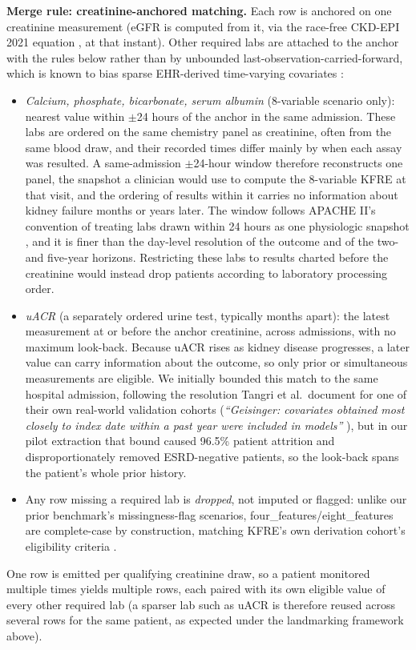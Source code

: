 \documentclass[10pt,letterpaper]{article}
\begin{document}
\textbf{Merge rule: creatinine-anchored matching.} Each row is anchored on one creatinine measurement (eGFR is computed from it, via the race-free CKD-EPI 2021 equation \cite{inker2021ckdepi}, at that instant). Other required labs are attached to the anchor with the rules below rather than by unbounded last-observation-carried-forward, which is known to bias sparse EHR-derived time-varying covariates \cite{hu2022locf_bias}:
\begin{itemize}
    \item \textit{Calcium, phosphate, bicarbonate, serum albumin} (8-variable scenario only): nearest value within $\pm$24 hours of the anchor in the same admission. These labs are ordered on the same chemistry panel as creatinine, often from the same blood draw, and their recorded times differ mainly by when each assay was resulted. A same-admission $\pm$24-hour window therefore reconstructs one panel, the snapshot a clinician would use to compute the 8-variable KFRE at that visit, and the ordering of results within it carries no information about kidney failure months or years later. The window follows APACHE II's convention of treating labs drawn within 24 hours as one physiologic snapshot \cite{knaus1985apacheii}, and it is finer than the day-level resolution of the outcome and of the two- and five-year horizons. Restricting these labs to results charted before the creatinine would instead drop patients according to laboratory processing order.
    \item \textit{uACR} (a separately ordered urine test, typically months apart): the latest measurement at or before the anchor creatinine, across admissions, with no maximum look-back. Because uACR rises as kidney disease progresses, a later value can carry information about the outcome, so only prior or simultaneous measurements are eligible. We initially bounded this match to the same hospital admission, following the resolution Tangri et al.\ document for one of their own real-world validation cohorts (\textit{``Geisinger: covariates obtained most closely to index date within a past year were included in models''} \cite{tangri2016multinational}), but in our pilot extraction that bound caused 96.5\% patient attrition and disproportionately removed ESRD-negative patients, so the look-back spans the patient's whole prior history.
    \item Any row missing a required lab is \emph{dropped}, not imputed or flagged: unlike our prior benchmark's missingness-flag scenarios, four\_features/eight\_features are complete-case by construction, matching KFRE's own derivation cohort's eligibility criteria \cite{tangri2011predicting}.
\end{itemize}
One row is emitted per qualifying creatinine draw, so a patient monitored multiple times yields multiple rows, each paired with its own eligible value of every other required lab (a sparser lab such as uACR is therefore reused across several rows for the same patient, as expected under the landmarking framework above).
\end{document}
